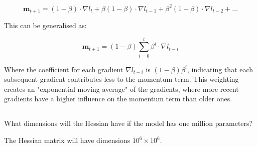 \documentclass[12pt]{report}
\begin{document}
\begin{equation*}
    \mathbf{m}_{t+1} = (1-\beta)\cdot\nabla l_{t} + \beta(1-\beta)\cdot\nabla l_{t-1} + \beta^2(1-\beta)\cdot\nabla l_{t-2} + \ldots
\end{equation*}

This can be generalised as:

\begin{equation*}
    \mathbf{m}_{t+1} = (1-\beta)\sum_{i=0}^{t} \beta^{i}\cdot\nabla l_{t-i}
\end{equation*}

Where the coefficient for each gradient $\nabla l_{t-i}$ is $(1-\beta)\beta^{i}$, indicating that each subsequent gradient contributes less to the momentum term. This weighting creates an "exponential moving average" of the gradients, where more recent gradients have a higher influence on the momentum term than older ones.

\subsection{}
\begin{mdframed}
    What dimensions will the Hessian have if the model has one million parameters?
\end{mdframed}

The Hessian matrix will have dimensions $10^6 \times 10^6$.
\end{document}
